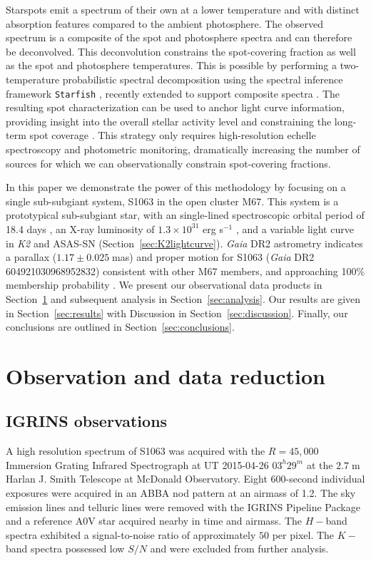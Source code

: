 \documentclass[modern,trackchanges]{aastex631}
\begin{document}
Starspots emit a spectrum of their own at a lower temperature and with distinct absorption features compared to the ambient photosphere. The observed spectrum is a composite of the spot and photosphere spectra and can therefore be deconvolved. This deconvolution constrains the spot-covering fraction as well as the spot and photosphere temperatures. This is possible by performing a two-temperature probabilistic spectral decomposition using the spectral inference framework \texttt{Starfish} \citep{czekala15}, recently extended to support composite spectra \citep{gullysantiago17}. The resulting spot characterization can be used to anchor light curve information, providing insight into the overall stellar activity level and constraining the long-term spot coverage \citep{neff95}. This strategy only requires high-resolution echelle spectroscopy and photometric monitoring, dramatically increasing the number of sources for which we can observationally constrain spot-covering fractions.

In this paper we demonstrate the power of this methodology by focusing on a single sub-subgiant system, S1063 in the open cluster M67. This system is a prototypical sub-subgiant star, with an single-lined spectroscopic orbital period of 18.4 days \citep{geller17}, an X-ray luminosity of $1.3\times10^{31}$ erg s$^{-1}$ \citep{vandenberg99}, and a variable light curve in \textit{K2} and ASAS-SN (Section~\ref{sec:K2lightcurve}). \emph{Gaia} DR2 astrometry \citep{2016A&A...595A...1G, 2018A&A...616A...1G} indicates a parallax ($1.17\pm0.025 \;$mas) and proper motion for S1063 (\emph{Gaia} DR2 604921030968952832) consistent with other M67 members, and approaching 100\% membership probability \citep{2018ApJ...869....9G}. We present our observational data products in Section~\ref{sec:observations} and subsequent analysis in Section~\ref{sec:analysis}. Our results are given in Section~\ref{sec:results} with Discussion in Section~\ref{sec:discussion}. Finally, our conclusions are outlined in Section~\ref{sec:conclusions}.


\section{Observation and data reduction}
\label{sec:observations}


\subsection{IGRINS observations}
A high resolution spectrum of S1063 was acquired with the $R=45,000$ Immersion Grating Infrared Spectrograph \citep[IGRINS;][]{park14} at UT 2015-04-26 $03^h29^m$ at the $2.7\;$m Harlan J. Smith Telescope at McDonald Observatory.  Eight 600-second individual exposures were acquired in an ABBA nod pattern at an airmass of 1.2.  The sky emission lines and telluric lines were removed with the IGRINS Pipeline Package  \citep[PLP;][]{jaejoonlee16} and a reference A0V star acquired nearby in time and airmass.
The $H-$band spectra exhibited a signal-to-noise ratio of approximately $50$ per pixel.
The $K-$band spectra possessed low $S/N$ and were excluded from further analysis.
\end{document}
